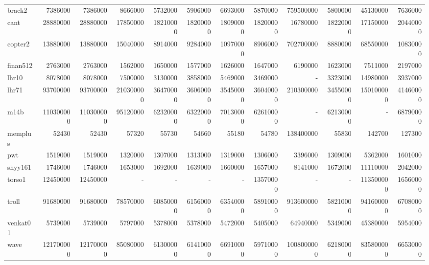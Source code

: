 \begin{table}[h]
{{\begin{tabular}{|l|r|r|r|r|r|r|r|r|r|r|r|}
brack2 & 7386000 & 7386000 & 8666000 & 5732000 & 5906000 & 6693000 & 5870000 & 759500000 & 5800000 & 45130000 & 7636000 \\
cant & 28880000 & 28880000 & 17850000 & 18210000 & 18200000 & 18090000 & 18200000 & 16780000 & 18220000 & 17150000 & 20440000 \\
copter2 & 13880000 & 13880000 & 15040000 & 8914000 & 9284000 & 10970000 & 8906000 & 702700000 & 8880000 & 68550000 & 10830000 \\
finan512 & 2763000 & 2763000 & 1562000 & 1650000 & 1577000 & 1626000 & 1647000 & 6190000 & 1623000 & 7511000 & 2197000 \\
lhr10 & 8078000 & 8078000 & 7500000 & 3130000 & 3858000 & 5469000 & 3469000 & - & 3323000 & 14980000 & 3937000 \\
lhr71 & 93700000 & 93700000 & 210300000 & 36470000 & 36060000 & 35450000 & 36040000 & 210300000 & 34550000 & 150100000 & 41460000 \\
m14b & 110300000 & 110300000 & 95120000 & 62320000 & 63220000 & 70130000 & 62610000 & - & 62130000 & - & 68790000 \\
memplus & 52430 & 52430 & 57320 & 55730 & 54660 & 55180 & 54780 & 138400000 & 55830 & 142700 & 127300 \\
pwt & 1519000 & 1519000 & 1320000 & 1307000 & 1313000 & 1319000 & 1306000 & 3396000 & 1309000 & 5362000 & 1601000 \\
shyy161 & 1746000 & 1746000 & 1653000 & 1692000 & 1639000 & 1660000 & 1657000 & 8141000 & 1672000 & 11110000 & 2042000 \\
torso1 & 12450000 & 12450000 & - & - & - & - & 13570000 & - & - & 113500000 & 16560000 \\
troll & 91680000 & 91680000 & 78570000 & 60850000 & 61560000 & 63540000 & 58910000 & 913600000 & 58210000 & 941600000 & 67080000 \\
venkat01 & 5739000 & 5739000 & 5797000 & 5378000 & 5378000 & 5472000 & 5405000 & 64940000 & 5349000 & 45380000 & 5954000 \\
wave & 121700000 & 121700000 & 85080000 & 61300000 & 61410000 & 66910000 & 59710000 & 1008000000 & 62180000 & 835800000 & 66530000 \\
\hline
\end{tabular}%
}%
}
\end{table}

